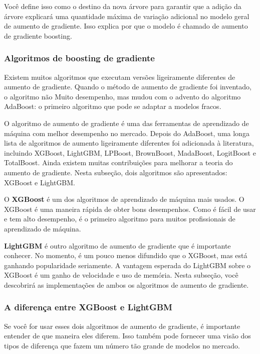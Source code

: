 Você define isso como o destino da nova árvore para garantir que a adição da árvore explicará uma quantidade máxima de variação adicional no modelo geral de aumento de gradiente. Isso explica por que o modelo é chamado de aumento de gradiente boosting.

\subsubsection{Algoritmos de boosting de gradiente}

Existem muitos algoritmos que executam versões ligeiramente diferentes de aumento de gradiente. Quando o método de aumento de gradiente foi inventado, o algoritmo não Muito desempenho, mas mudou com o advento do algoritmo AdaBoost: o primeiro algoritmo que pode se adaptar a modelos fracos. 

O algoritmo de aumento de gradiente é uma das ferramentas de aprendizado de máquina com melhor desempenho no mercado. Depois do AdaBoost, uma longa lista de algoritmos de aumento ligeiramente diferentes foi adicionada à literatura, incluindo XGBoost, LightGBM, LPBoost, BrownBoost, MadaBoost, LogitBoost e TotalBoost. Ainda existem muitas contribuições para melhorar a teoria do aumento de gradiente. Nesta subseção, dois algoritmos são apresentados: XGBoost e LightGBM.

O \textbf{XGBoost} é um dos algoritmos de aprendizado de máquina mais usados. O XGBoost é uma maneira rápida de obter bons desempenhos. Como é fácil de usar e tem alto desempenho, é o primeiro algoritmo para muitos profissionais de aprendizado de máquina.

\textbf{LightGBM} é outro algoritmo de aumento de gradiente que é importante conhecer. No momento, é um pouco menos difundido que o XGBoost, mas está ganhando popularidade seriamente.
A vantagem esperada do LightGBM sobre o XGBoost é um ganho de velocidade e uso de memória.
Nesta subseção, você descobrirá as implementações de ambos os algoritmos de aumento de gradiente.

\subsubsection{A diferença entre XGBoost e LightGBM}

Se você for usar esses dois algoritmos de aumento de gradiente, é importante entender de
que maneira eles diferem. Isso também pode fornecer uma visão dos tipos de diferença que fazem um número tão grande de modelos no mercado.

